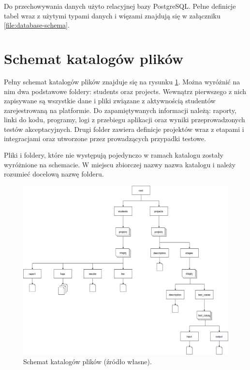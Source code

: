 Do przechowywania danych użyto relacyjnej bazy PostgreSQL.
Pełne definicje tabel wraz z użytymi typami danych i więzami znajdują się w załączniku \ref{file:database-schema}.


\section{Schemat katalogów plików}
\label{directories}

Pełny schemat katalogów plików znajduje się na rysunku \ref{fig:platform-directories}.
Można wyróżnić na nim dwa podstawowe foldery: students oraz projects.
Wewnątrz pierwszego z nich zapisywane są wszystkie dane i pliki związane z aktywnością studentów zarejestrowaną na platformie.
Do zapamiętywanych informacji należą: raporty, linki do kodu, programy, logi z przebiegu aplikacji oraz wyniki przeprowadzonych testów akceptacyjnych.
Drugi folder zawiera definicje projektów wraz z etapami i integracjami oraz utworzone przez prowadzących przypadki testowe.

Pliki i foldery, które nie występują pojedynczo w ramach katalogu zostały wyróżnione na schemacie.
W miejscu zbiorczej nazwy nazwa katalogu i należy rozumieć docelową nazwę folderu.

\vfill

\begin{figure}[H]
    \centering
    \includegraphics[width = 16cm, angle =90]{chapter02/directories.png}
    \caption{Schemat katalogów plików (źródło własne).}
    \label{fig:platform-directories}
\end{figure}

